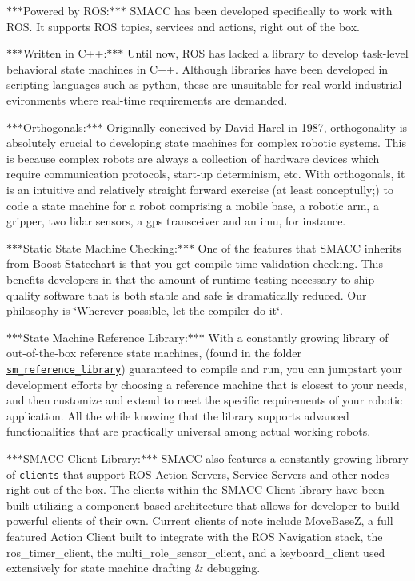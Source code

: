 \begin{DoxyItemize}
\item $\ast$$\ast$$\ast$\+Powered by R\+OS\+:$\ast$$\ast$$\ast$ S\+M\+A\+CC has been developed specifically to work with R\+OS. It supports R\+OS topics, services and actions, right out of the box.
\item $\ast$$\ast$$\ast$\+Written in C++\+:$\ast$$\ast$$\ast$ Until now, R\+OS has lacked a library to develop task-\/level behavioral state machines in C++. Although libraries have been developed in scripting languages such as python, these are unsuitable for real-\/world industrial evironments where real-\/time requirements are demanded.
\item $\ast$$\ast$$\ast$\+Orthogonals\+:$\ast$$\ast$$\ast$ Originally conceived by David Harel in 1987, orthogonality is absolutely crucial to developing state machines for complex robotic systems. This is because complex robots are always a collection of hardware devices which require communication protocols, start-\/up determinism, etc. With orthogonals, it is an intuitive and relatively straight forward exercise (at least conceptully;) to code a state machine for a robot comprising a mobile base, a robotic arm, a gripper, two lidar sensors, a gps transceiver and an imu, for instance.
\item $\ast$$\ast$$\ast$\+Static State Machine Checking\+:$\ast$$\ast$$\ast$ One of the features that S\+M\+A\+CC inherits from Boost Statechart is that you get compile time validation checking. This benefits developers in that the amount of runtime testing necessary to ship quality software that is both stable and safe is dramatically reduced. Our philosophy is \char`\"{}\+Wherever possible, let the compiler do it\char`\"{}.
\item $\ast$$\ast$$\ast$\+State Machine Reference Library\+:$\ast$$\ast$$\ast$ With a constantly growing library of out-\/of-\/the-\/box reference state machines, (found in the folder \href{https://github.com/reelrbtx/SMACC/tree/master/smacc_sm_reference_library}{\tt sm\+\_\+reference\+\_\+library}) guaranteed to compile and run, you can jumpstart your development efforts by choosing a reference machine that is closest to your needs, and then customize and extend to meet the specific requirements of your robotic application. All the while knowing that the library supports advanced functionalities that are practically universal among actual working robots.
\item $\ast$$\ast$$\ast$\+S\+M\+A\+CC Client Library\+:$\ast$$\ast$$\ast$ S\+M\+A\+CC also features a constantly growing library of \href{https://github.com/reelrbtx/SMACC/tree/master/smacc_client_library}{\tt clients} that support R\+OS Action Servers, Service Servers and other nodes right out-\/of-\/the box. The clients within the S\+M\+A\+CC Client library have been built utilizing a component based architecture that allows for developer to build powerful clients of their own. Current clients of note include Move\+BaseZ, a full featured Action Client built to integrate with the R\+OS Navigation stack, the ros\+\_\+timer\+\_\+client, the multi\+\_\+role\+\_\+sensor\+\_\+client, and a keyboard\+\_\+client used extensively for state machine drafting \& debugging.

\end{DoxyItemize}
